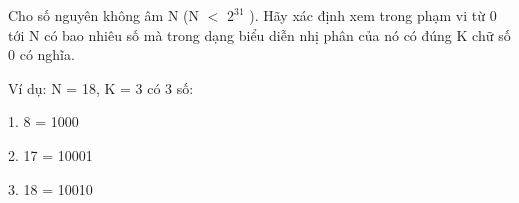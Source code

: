 Cho số nguyên không âm N (N $<$ $2^{31}$   ). Hãy xác định xem trong phạm vi từ 0 tới N có bao nhiêu số mà trong dạng biểu diễn nhị phân của nó có đúng K chữ số 0 có nghĩa.  

   Ví dụ: N = 18, K = 3 có 3 số:  

   1. 8 = 1000  

   2. 17 = 10001  

   3. 18 = 10010